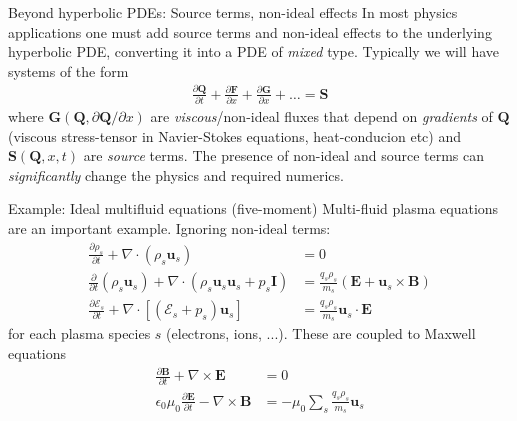 \documentclass[aspectratio=169]{beamer}
\newcommand{\pfrac}[2]{\frac{\partial #1}{\partial #2}}
\newcommand{\pfraca}[1]{\frac{\partial}{\partial #1}}
\newcommand{\mvec}[1]{\mathbf{#1}}
\begin{document}
\begin{frame}{Beyond hyperbolic PDEs: Source terms, non-ideal effects}
  In most physics applications one must add source terms and non-ideal
  effects to the underlying hyperbolic PDE, converting it into a PDE
  of \emph{mixed} type. Typically we will have systems of the form
  \begin{align*}
    \pfrac{\mvec{Q}}{t} + \pfrac{\mvec{F}}{x} + \pfrac{\mvec{G}}{x}
    + \ldots
    = \mvec{S}
  \end{align*}
  where $\mvec{G}(\mvec{Q},\partial\mvec{Q}/\partial x)$ are
  \emph{viscous}/non-ideal fluxes that depend on \emph{gradients} of
  $\mvec{Q}$ (viscous stress-tensor in Navier-Stokes equations,
  heat-conducion etc) and $\mvec{S}(\mvec{Q},x,t)$ are \emph{source}
  terms.%
  \vskip0.1in%
  The presence of non-ideal and source terms can \emph{significantly}
  change the physics and required numerics.
\end{frame}

\begin{frame}{Example: Ideal multifluid equations (five-moment)}
  Multi-fluid plasma equations are an important example. Ignoring
  non-ideal terms:
  \begin{align*}
    \pfrac{\rho_s}{t} + \nabla\cdot(\rho_s\mvec{u}_s) &= 0 \\
    \pfraca{t}(\rho_s\mvec{u}_s) + \nabla\cdot(\rho_s\mvec{u}_s\mvec{u}_s + p_s\mvec{I})
                                                      &=
                                                        \frac{q_s\rho_s}{m_s}(\mvec{E} + \mvec{u}_s\times \mvec{B})
    \\
    \pfrac{\mathcal{E}_s}{t} + \nabla\cdot\left[(\mathcal{E}_s+p_s)\mvec{u}_s
    \right] &= \frac{q_s\rho_s}{m_s}\mvec{u}_s\cdot\mvec{E}
  \end{align*}
  for each plasma species $s$ (electrons, ions, ...). These are
  coupled to Maxwell equations
  \begin{align*}
    \frac{\partial \mathbf{B}}{\partial t} + \nabla \times \mathbf{E}
    &= 0 \\
    \epsilon_0 \mu_0 \frac{\partial \mathbf{E}}{\partial t} - \nabla
    \times \mathbf{B} &= -\mu_{0}\sum_s \frac{q_s\rho_s}{m_s}\mvec{u}_s
  \end{align*}
\end{frame}
\end{document}
